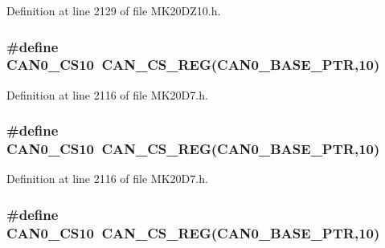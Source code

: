 Definition at line 2129 of file M\+K20\+D\+Z10.\+h.

\subsubsection[{\texorpdfstring{C\+A\+N0\+\_\+\+C\+S10}{CAN0_CS10}}]{\setlength{\rightskip}{0pt plus 5cm}\#define C\+A\+N0\+\_\+\+C\+S10~{\bf C\+A\+N\+\_\+\+C\+S\+\_\+\+R\+EG}({\bf C\+A\+N0\+\_\+\+B\+A\+S\+E\+\_\+\+P\+TR},10)}\hypertarget{group___c_a_n___register___accessor___macros_ga274fdafd3b4b40a90ea4d517aeac03ec}{}\label{group___c_a_n___register___accessor___macros_ga274fdafd3b4b40a90ea4d517aeac03ec}


Definition at line 2116 of file M\+K20\+D7.\+h.

\subsubsection[{\texorpdfstring{C\+A\+N0\+\_\+\+C\+S10}{CAN0_CS10}}]{\setlength{\rightskip}{0pt plus 5cm}\#define C\+A\+N0\+\_\+\+C\+S10~{\bf C\+A\+N\+\_\+\+C\+S\+\_\+\+R\+EG}({\bf C\+A\+N0\+\_\+\+B\+A\+S\+E\+\_\+\+P\+TR},10)}\hypertarget{group___c_a_n___register___accessor___macros_ga274fdafd3b4b40a90ea4d517aeac03ec}{}\label{group___c_a_n___register___accessor___macros_ga274fdafd3b4b40a90ea4d517aeac03ec}


Definition at line 2116 of file M\+K20\+D7.\+h.

\subsubsection[{\texorpdfstring{C\+A\+N0\+\_\+\+C\+S10}{CAN0_CS10}}]{\setlength{\rightskip}{0pt plus 5cm}\#define C\+A\+N0\+\_\+\+C\+S10~{\bf C\+A\+N\+\_\+\+C\+S\+\_\+\+R\+EG}({\bf C\+A\+N0\+\_\+\+B\+A\+S\+E\+\_\+\+P\+TR},10)}\hypertarget{group___c_a_n___register___accessor___macros_ga274fdafd3b4b40a90ea4d517aeac03ec}{}\label{group___c_a_n___register___accessor___macros_ga274fdafd3b4b40a90ea4d517aeac03ec}


